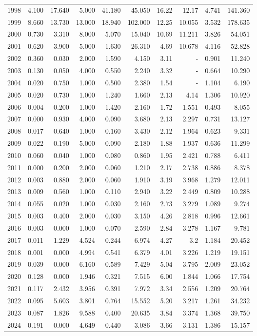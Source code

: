 \documentclass[
]{scrartcl}
\begin{document}
\begin{longtable}{rrrrrrrrrr}
1998 & 4.100 & 17.640 & 5.000 & 41.180 & 45.050 & 16.22 & 12.17 & 4.741 & 141.360 \\ 
1999 & 8.660 & 13.730 & 13.000 & 18.940 & 102.000 & 12.25 & 10.055 & 3.532 & 178.635 \\ 
2000 & 0.730 & 3.310 & 8.000 & 5.070 & 15.040 & 10.69 & 11.211 & 3.826 & 54.051 \\ 
2001 & 0.620 & 3.900 & 5.000 & 1.630 & 26.310 & 4.69 & 10.678 & 4.116 & 52.828 \\ 
2002 & 0.360 & 0.030 & 2.000 & 1.590 & 4.150 & 3.11 &  -  & 0.901 & 11.240 \\ 
2003 & 0.130 & 0.050 & 4.000 & 0.550 & 2.240 & 3.32 &  -  & 0.664 & 10.290 \\ 
2004 & 0.020 & 0.750 & 1.000 & 0.500 & 2.380 & 1.54 &  -  & 1.104 & 6.190 \\ 
2005 & 0.020 & 0.730 & 1.000 & 1.240 & 1.660 & 2.13 & 4.14 & 1.306 & 10.920 \\ 
2006 & 0.004 & 0.200 & 1.000 & 1.420 & 2.160 & 1.72 & 1.551 & 0.493 & 8.055 \\ 
2007 & 0.000 & 0.930 & 4.000 & 0.090 & 3.680 & 2.13 & 2.297 & 0.731 & 13.127 \\ 
2008 & 0.017 & 0.640 & 1.000 & 0.160 & 3.430 & 2.12 & 1.964 & 0.623 & 9.331 \\ 
2009 & 0.022 & 0.190 & 5.000 & 0.090 & 2.180 & 1.88 & 1.937 & 0.636 & 11.299 \\ 
2010 & 0.060 & 0.040 & 1.000 & 0.080 & 0.860 & 1.95 & 2.421 & 0.788 & 6.411 \\ 
2011 & 0.000 & 0.200 & 2.000 & 0.060 & 1.210 & 2.17 & 2.738 & 0.886 & 8.378 \\ 
2012 & 0.003 & 0.880 & 2.000 & 0.060 & 1.910 & 3.19 & 3.968 & 1.279 & 12.011 \\ 
2013 & 0.009 & 0.560 & 1.000 & 0.110 & 2.940 & 3.22 & 2.449 & 0.809 & 10.288 \\ 
2014 & 0.055 & 0.020 & 1.000 & 0.030 & 2.160 & 2.73 & 3.279 & 1.089 & 9.274 \\ 
2015 & 0.003 & 0.400 & 2.000 & 0.030 & 3.150 & 4.26 & 2.818 & 0.996 & 12.661 \\ 
2016 & 0.003 & 0.000 & 1.000 & 0.070 & 2.590 & 2.84 & 3.278 & 1.167 & 9.781 \\ 
2017 & 0.011 & 1.229 & 4.524 & 0.244 & 6.974 & 4.27 & 3.2 & 1.184 & 20.452 \\ 
2018 & 0.001 & 0.000 & 4.994 & 0.541 & 6.379 & 4.01 & 3.226 & 1.219 & 19.151 \\ 
2019 & 0.039 & 0.000 & 6.160 & 0.589 & 7.429 & 5.04 & 3.795 & 2.009 & 23.052 \\ 
2020 & 0.128 & 0.000 & 1.946 & 0.321 & 7.515 & 6.00 & 1.844 & 1.066 & 17.754 \\ 
2021 & 0.117 & 2.432 & 3.956 & 0.391 & 7.972 & 3.34 & 2.556 & 1.209 & 20.764 \\ 
2022 & 0.095 & 5.603 & 3.801 & 0.764 & 15.552 & 5.20 & 3.217 & 1.261 & 34.232 \\ 
2023 & 0.087 & 1.826 & 9.588 & 0.400 & 20.635 & 3.84 & 3.374 & 1.368 & 39.750 \\ 
2024 & 0.191 & 0.000 & 4.649 & 0.440 & 3.086 & 3.66 & 3.131 & 1.386 & 15.157 \\ 
\bottomrule


\end{longtable}
\end{document}
